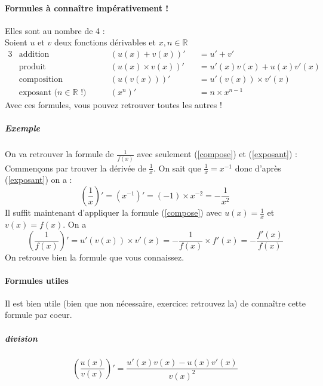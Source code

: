 \documentclass[11pt]{article}
\newcommand{\R}{\mathbb R}
\newcommand{\de}[1]{\left(#1\right)'}
\begin{document}
        \paragraph{Formules à connaître impérativement !}
        Elles sont au nombre de 4 : \\Soient $u$ et $v$ deux fonctions dérivables et $x,n \in  \R $
        \begin{alignat}{3}
            &\text{addition} &\qquad& (u(x) + v(x))'&& = u'+v' \label{addition} \\
            &\text{produit} && (u(x) \times v(x))'&& = u'(x)v(x) + u(x)v'(x) \label{produit}\\
            &\text{composition} && (u(v(x)))'&& = u'(v(x)) \times v'(x) \label{compose}\\
            &\text{exposant ($n\in \R$ !)} && (x^n)'&& = n \times x^{n-1} \label{exposant}
        \end{alignat}
        Avec ces formules, vous pouvez retrouver toutes les autres !
        \subparagraph{Exemple} On va retrouver la formule de $\frac{1}{f(x)}$ avec seulement (\ref{compose}) et (\ref{exposant}) :\\
            Commençons par trouver la dérivée de $\frac{1}{x}$.
            On sait que $\frac{1}{x}=x^{-1}$ donc d'après (\ref{exposant}) on a :
                \begin{equation*}
                    \de{\frac{1}{x}}=\de{x^{-1}}=(-1)\times x^{-2} = -\frac{1}{x^2}
                \end{equation*}
            Il suffit maintenant d'appliquer la formule (\ref{compose}) avec $u(x)=\frac{1}{x}$ et $v(x)=f(x)$. On a 
                \begin{equation*}
                    \de{\frac{1}{f(x)}}=u'(v(x))\times v'(x)=-\frac{1}{f(x)}\times f'(x)=-\frac{f'(x)}{f(x)}
                \end{equation*}
            On retrouve bien la formule que vous connaissez.
        \paragraph{Formules utiles}
        Il est bien utile (bien que non nécessaire, exercice: retrouvez la) de connaître cette formule par coeur.
        \subparagraph{division}
        \begin{equation*}
            \de{\frac{u(x)}{v(x)}} = \frac{u'(x)v(x) - u(x)v'(x)}{v(x)^2}
        \end{equation*}
\end{document}
